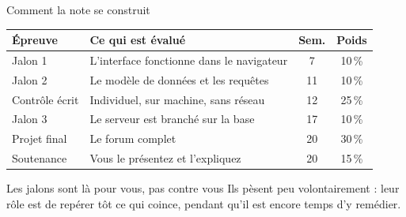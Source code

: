 \documentclass[aspectratio=169,11pt]{beamer}
\begin{document}
\begin{frame}{Comment la note se construit}
  \vspace{0.2cm}
  \begin{center}
  \renewcommand{\arraystretch}{1.25}
  \begin{tabularx}{0.92\textwidth}{lXcc}
    \toprule
    \rowcolor{accentBlue}
    \color{white}\textbf{Épreuve} & \color{white}\textbf{Ce qui est évalué} &
    \color{white}\textbf{Sem.} & \color{white}\textbf{Poids} \\
    \midrule
    \rowcolor{cfptGrey}
    Jalon 1 & L'interface fonctionne dans le navigateur & 7 & 10\,\% \\
    Jalon 2 & Le modèle de données et les requêtes & 11 & 10\,\% \\
    \rowcolor{cfptGrey}
    Contrôle écrit & Individuel, sur machine, sans réseau & 12 & 25\,\% \\
    Jalon 3 & Le serveur est branché sur la base & 17 & 10\,\% \\
    \rowcolor{cfptGrey}
    Projet final & Le forum complet & 20 & 30\,\% \\
    Soutenance & Vous le présentez et l'expliquez & 20 & 15\,\% \\
    \bottomrule
  \end{tabularx}
  \end{center}
  \vspace{0.05cm}
  \begin{block}{Les jalons sont là pour vous, pas contre vous}
    \small Ils pèsent peu volontairement : leur rôle est de repérer tôt ce qui coince, pendant qu'il est encore temps d'y remédier.
  \end{block}
\end{frame}
\end{document}
